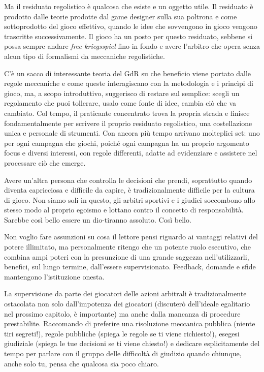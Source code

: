 Ma il residuato regolistico è qualcosa che esiste e un oggetto utile. Il residuato è prodotto dalle teorie prodotte dal game designer sulla sua poltrona e come sottoprodotto del gioco effettivo, quando le idee che sovvengono in gioco vengono trascritte successivamente. Il gioco ha un posto per questo residuato, sebbene si possa sempre andare \textit{free kriegsspiel} fino in fondo e avere l'arbitro che opera senza alcun tipo di formalismi da meccaniche regolistiche.

C'è un sacco di interessante teoria del GdR su che beneficio viene portato dalle regole meccaniche e come queste interagiscano con la metodologia e i princìpi di gioco, ma, a scopo introduttivo, suggerisco di restare sul semplice: scegli un regolamento che puoi tollerare, usalo come fonte di idee, cambia ciò che va cambiato. Col tempo, il praticante concentrato trova la propria strada e finisce fondamentalmente per scrivere il proprio residuato regolistico, una costellazione unica e personale di strumenti. Con ancora più tempo arrivano molteplici set: uno per ogni campagna che giochi, poiché ogni campagna ha un proprio argomento focus e diversi interessi, con regole differenti, adatte ad evidenziare e assistere nel processare ciò che emerge.


Avere un'altra persona che controlla le decisioni che prendi, soprattutto quando diventa capricciosa e difficile da capire, è tradizionalmente difficile per la cultura di gioco. Non siamo soli in questo, gli arbitri sportivi e i giudici soccombono allo stesso modo al proprio egoismo e lottano contro il concetto di responsabilità. Sarebbe così bello essere un dio-tiranno assoluto. Così bello.

Non voglio fare assunzioni su cosa il lettore pensi riguardo ai vantaggi relativi del potere illimitato, ma personalmente ritengo che un potente ruolo esecutivo, che combina ampi poteri con la presunzione di una grande saggezza nell'utilizzarli, benefici, sul lungo termine, dall'essere supervisionato. Feedback, domande e sfide mantengono l'istituzione onesta.

La supervisione da parte dei giocatori delle azioni arbitrali è tradizionalmente ostacolata non solo dall'impotenza dei giocatori (discuterò dell'ideale egalitario nel prossimo capitolo, è importante) ma anche dalla mancanza di procedure prestabilite. Raccomando di preferire una risoluzione meccanica pubblica (niente tiri segreti!), regole pubbliche (spiega le regole se ti viene richiesto!), esegesi giudiziale (spiega le tue decisioni se ti viene chiesto!) e dedicare esplicitamente del tempo per parlare con il gruppo delle difficoltà di giudizio quando chiunque, anche solo tu, pensa che qualcosa sia poco chiaro.

